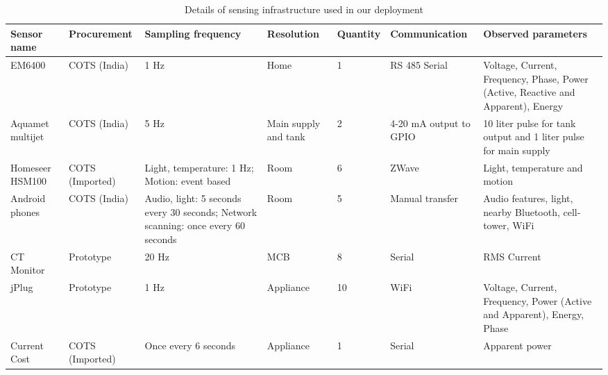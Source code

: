 \documentclass[10pt]{sensys-proc}
\begin{document}
\begin{table}[t!]
\footnotesize
\centering
\vspace{-4mm}
\caption{Details of sensing infrastructure used in our deployment}
\vspace{-4mm}
\label{tab:sensing}
\tabcolsep=0.015cm
\begin{center}
\begin{tabular}{|p{1.7cm}|p{2.0cm}|p{3.3cm}|p{1.5cm}|p{1.5cm}|p{2.0cm}|p{5.2cm}|}
\hline
\textbf{Sensor name} & \textbf{Procurement} & \textbf{Sampling frequency} & \textbf{Resolution} & \textbf{Quantity} & \textbf{Communication} & \textbf{Observed parameters}\\
\hline

EM6400& COTS (India)&1 Hz&Home&1&RS 485 Serial&Voltage, Current, Frequency, Phase, Power (Active, Reactive and Apparent), Energy\\ \hline
Aquamet multijet & COTS (India) &5 Hz&Main supply and tank&2&4-20 mA output to GPIO &10 liter pulse for tank output and 1 liter pulse for main supply\\ \hline
Homeseer HSM100 &COTS (Imported)&Light, temperature: 1 Hz; Motion: event based &Room &6&ZWave&Light, temperature and motion\\ \hline
Android phones &COTS (India) & Audio, light: 5 seconds every 30 seconds; Network scanning: once every 60 seconds&Room&5&Manual transfer&Audio features, light, nearby Bluetooth, cell-tower, WiFi\\ \hline
CT Monitor&Prototype &20 Hz&MCB&8&Serial&RMS Current \\\hline
jPlug& Prototype &1 Hz &Appliance&10&WiFi&Voltage, Current, Frequency, Power (Active and Apparent), Energy, Phase\\ \hline	
Current Cost&COTS (Imported)& Once every 6 seconds &Appliance&1&Serial&Apparent power\\ \hline
\end{tabular}
\end{center}
\vspace{-4mm}
\end{table}
\end{document}
